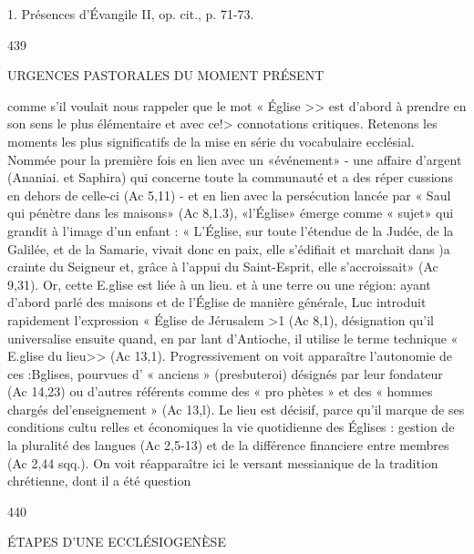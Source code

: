 1.	Présences d'Évangile II, op. cit., p. 71-73.

439
 
URGENCES PASTORALES DU MOMENT PRÉSENT

comme s'il voulait nous rappeler que le mot « Église >> est d'abord à prendre en son sens le plus élémentaire et avec ce!> connotations critiques.
Retenons les moments les plus significatifs de la mise en
série du vocabulaire ecclésial. Nommée pour la première fois en lien avec un «événement» -	une affaire d'argent (Ananiai. et Saphira) qui concerne toute la communauté et a des réper­ cussions en dehors de celle-ci (Ac 5,11) -	et en lien avec la persécution lancée par « Saul qui pénètre dans les maisons» (Ac 8,1.3), «l'Église» émerge comme « sujet» qui grandit à l'image d'un enfant : « L'Église, sur toute l'étendue de la Judée, de la Galilée, et de la Samarie, vivait donc en paix, elle s'édifiait et marchait dans )a crainte du Seigneur et, grâce à l'appui du Saint-Esprit, elle s'accroissait» (Ac 9,31).
Or, cette E.glise est liée à un lieu. et à une terre ou une région:
ayant d'abord parlé des maisons et de l'Église de manière générale, Luc introduit rapidement l'expression « Église de Jérusalem >1 (Ac 8,1), désignation qu'il universalise ensuite quand, en par­ lant d'Antioche, il utilise le terme technique « E.glise du lieu>> (Ac 13,1). Progressivement on voit apparaître l'autonomie de ces :Bglises, pourvues d' « anciens » (presbuteroi) désignés par leur fondateur (Ac 14,23) ou d'autres référents comme des « pro­ phètes » et des « hommes chargés del'enseignement » (Ac 13,l). Le lieu est décisif, parce qu'il marque de ses conditions cultu­ relles et économiques la vie quotidienne des Églises : gestion de la pluralité des langues (Ac 2,5-13) et de la différence financiere entre membres (Ac 2,44 sqq.). On voit réapparaître ici le versant messianique de la tradition chrétienne, dont il a été question

440
 
ÉTAPES D'UNE ECCLÉSIOGENÈSE

